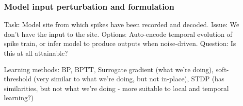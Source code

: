 \documentclass[mphil,deptreport,ianc]{infthesis} %
\begin{document}






\subsubsection{Model input perturbation and formulation}

Task: Model site from which spikes have been recorded and decoded. Issue: We don’t have the input to the site. Options: Auto-encode temporal evolution of spike train, or infer model to produce outputs when noise-driven. Question: Is this at all attainable?

Learning methods:
BP, BPTT, Surrogate gradient (what we’re doing), soft-threshold (very similar to what we’re doing, but not in-place), STDP (has similarities, but not what we’re doing - more suitable to local and temporal learning?)
\end{document}
